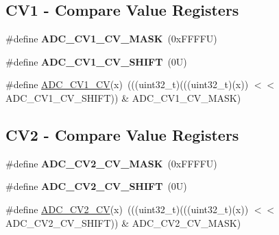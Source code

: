 \subsection*{C\+V1 -\/ Compare Value Registers}
\begin{DoxyCompactItemize}
\item 
\mbox{\label{group___a_d_c___register___masks_gad67c3b5f385cd9b26be8257134e1e3cf}} 
\#define {\bfseries A\+D\+C\+\_\+\+C\+V1\+\_\+\+C\+V\+\_\+\+M\+A\+SK}~(0x\+F\+F\+F\+F\+U)
\item 
\mbox{\label{group___a_d_c___register___masks_ga1925520ab1dd2eb81e0e4505af905c13}} 
\#define {\bfseries A\+D\+C\+\_\+\+C\+V1\+\_\+\+C\+V\+\_\+\+S\+H\+I\+FT}~(0\+U)
\item 
\#define \mbox{\hyperlink{group___a_d_c___register___masks_ga941b887791f6ce780cb100ff3ef98407}{A\+D\+C\+\_\+\+C\+V1\+\_\+\+CV}}(x)~(((uint32\+\_\+t)(((uint32\+\_\+t)(x)) $<$$<$ A\+D\+C\+\_\+\+C\+V1\+\_\+\+C\+V\+\_\+\+S\+H\+I\+FT)) \& A\+D\+C\+\_\+\+C\+V1\+\_\+\+C\+V\+\_\+\+M\+A\+SK)
\end{DoxyCompactItemize}
\subsection*{C\+V2 -\/ Compare Value Registers}
\begin{DoxyCompactItemize}
\item 
\mbox{\label{group___a_d_c___register___masks_gab61d022e3c8d84d77f2895a91c049023}} 
\#define {\bfseries A\+D\+C\+\_\+\+C\+V2\+\_\+\+C\+V\+\_\+\+M\+A\+SK}~(0x\+F\+F\+F\+F\+U)
\item 
\mbox{\label{group___a_d_c___register___masks_ga5ecccc775bd06291531df6e989024d38}} 
\#define {\bfseries A\+D\+C\+\_\+\+C\+V2\+\_\+\+C\+V\+\_\+\+S\+H\+I\+FT}~(0\+U)
\item 
\#define \mbox{\hyperlink{group___a_d_c___register___masks_gaa4d71a13e422a14048307c0acab90841}{A\+D\+C\+\_\+\+C\+V2\+\_\+\+CV}}(x)~(((uint32\+\_\+t)(((uint32\+\_\+t)(x)) $<$$<$ A\+D\+C\+\_\+\+C\+V2\+\_\+\+C\+V\+\_\+\+S\+H\+I\+FT)) \& A\+D\+C\+\_\+\+C\+V2\+\_\+\+C\+V\+\_\+\+M\+A\+SK)
\end{DoxyCompactItemize}
